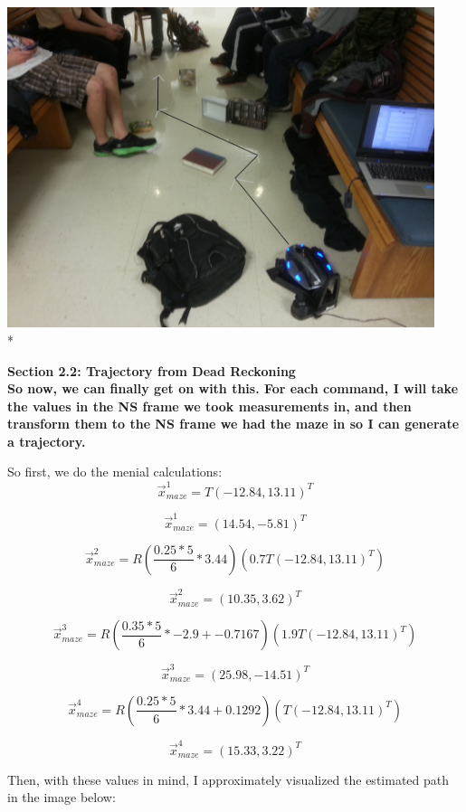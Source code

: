 \documentclass{article}
\begin{document}
{
\centering
\includegraphics[width=12.5cm]{expected.jpg} \\*
}

\vspace{8mm}
\bf Section 2.2: Trajectory from Dead Reckoning \rm\\
\vspace{4mm}
So now, we can finally get on with this. For each command, I will take the values in the NS frame we took measurements in, and then transform them to the NS frame we had the maze in so I can generate a trajectory.

So first, we do the menial calculations:
$$
\vec{x}^1_{maze} = T(-12.84, 13.11)^T
$$

$$
\vec{x}^1_{maze} = (14.54, -5.81)^T
$$

$$
\vec{x}^2_{maze} = R(\frac{0.25*5}{6}*3.44)(0.7T(-12.84, 13.11)^T)
$$

$$
\vec{x}^2_{maze} = (10.35, 3.62)^T
$$

$$
\vec{x}^3_{maze} = R(\frac{0.35*5}{6}*-2.9 + -0.7167)(1.9T(-12.84, 13.11)^T)
$$

$$
\vec{x}^3_{maze} = (25.98, -14.51)^T
$$

$$
\vec{x}^4_{maze} = R(\frac{0.25*5}{6}*3.44 + 0.1292)(T(-12.84, 13.11)^T)
$$

$$
\vec{x}^4_{maze} = (15.33, 3.22)^T
$$

Then, with these values in mind, I approximately visualized the estimated path in the image below:
\end{document}
